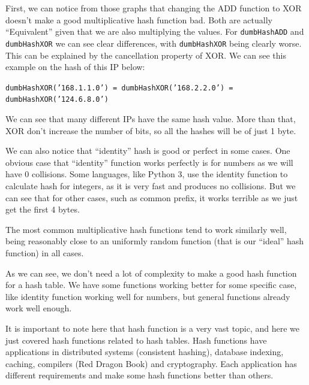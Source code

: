 First, we can notice from those graphs that changing the ADD function to XOR doesn't make a good multiplicative hash function bad. Both are actually ``Equivalent'' given that we are also multiplying the values. For \texttt{dumbHashADD} and \texttt{dumbHashXOR} we can see clear differences, with \texttt{dumbHashXOR} being clearly worse. This can be explained by the cancellation property of XOR. We can see this example on the hash of this IP below:

\texttt{dumbHashXOR('168.1.1.0') = dumbHashXOR('168.2.2.0') = dumbHashXOR('124.6.8.0')}

We can see that many different IPs have the same hash value. More than that, XOR don't increase the number of bits, so all the hashes will be of just 1 byte.

We can also notice that ``identity'' hash is good or perfect in some cases. One obvious case that ``identity'' function works perfectly is for numbers as we will have 0 collisions. Some languages, like Python 3, use the identity function to calculate hash for integers, as it is very fast and produces no collisions. But we can see that for other cases, such as common prefix, it works terrible as we just get the first 4 bytes.

The most common multiplicative hash functions tend to work similarly well, being reasonably close to an uniformly random function (that is our ``ideal'' hash function) in all cases.

As we can see, we don't need a lot of complexity to make a good hash function for a hash table. We have some functions working better for some specific case, like identity function working well for numbers, but general functions already work well enough.

It is important to note here that hash function is a very vast topic, and here we just covered hash functions related to hash tables. Hash functions have applications in distributed systems (consistent hashing), database indexing, caching, compilers (Red Dragon Book) and cryptography. Each application has different requirements and make some hash functions better than others.